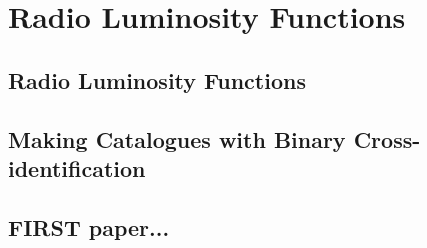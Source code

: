 \chapter{Radio Luminosity Functions}
\label{cha:rlfs}

\section{Radio Luminosity Functions}
\label{sec:rlfs}


\section{Making Catalogues with Binary Cross-identification}
\label{sec:revisiting-cross-id}


\section{FIRST paper...}
